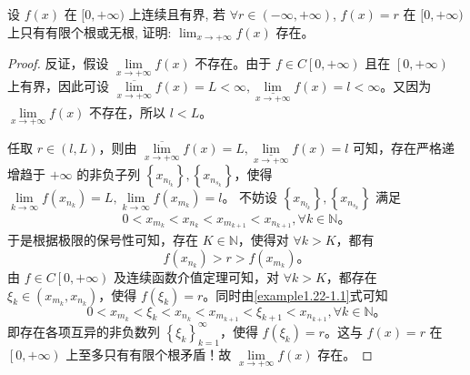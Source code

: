 \documentclass[lang=cn,newtx,10pt,scheme=chinese]{../Template/elegantbook}
\begin{document}
\begin{example}
设 $f(x)$ 在 $[0, +\infty)$ 上连续且有界, 若 $\forall r \in (-\infty, +\infty)$, $f(x) = r$ 在 $[0, +\infty)$ 上只有有限个根或无根, 证明: $\lim_{x \to +\infty} f(x)$ 存在。
\end{example}
\begin{proof}
反证，假设 $\underset{x\rightarrow +\infty}{\lim}f\left( x \right)$ 不存在。由于 $f\in C\left[ 0,+\infty \right)$ 且在 $\left[ 0,+\infty \right)$ 上有界，因此可设 $\underset{x\rightarrow +\infty}{\overline{\lim }}f\left( x \right) =L<\infty ,\underset{x\rightarrow +\infty}{\underline{\lim }}f\left( x \right) =l<\infty$。又因为 $\underset{x\rightarrow +\infty}{\lim}f\left( x \right)$ 不存在，所以 $l<L$。

任取 $r\in \left( l,L \right)$，则由 $\underset{x\rightarrow +\infty}{\overline{\lim }}f\left( x \right) =L,\underset{x\rightarrow +\infty}{\underline{\lim }}f\left( x \right) =l$ 可知，存在严格递增趋于 $+\infty$ 的非负子列 $\left\{ x_{n_{l_k}} \right\},\left\{ x_{n_{s_k}} \right\}$，使得 $\underset{k\rightarrow \infty}{\lim}f\left( x_{n_k} \right) =L,\underset{k\rightarrow \infty}{\lim}f\left( x_{m_k} \right) =l$。
不妨设 $\left\{ x_{n_{l_k}} \right\},\left\{ x_{n_{s_k}} \right\}$ 满足  
\begin{align}
0<x_{m_k}<x_{n_k}<x_{m_{k+1}}<x_{n_{k+1}},\forall k\in \mathbb{N}。 \label{example1.22-1.1}
\end{align}
于是根据极限的保号性可知，存在 $K\in \mathbb{N}$，使得对 $\forall k>K$，都有  
\[
f\left( x_{n_k} \right) >r>f\left( x_{m_k} \right)。
\]
由 $f\in C\left[ 0,+\infty \right)$ 及连续函数介值定理可知，对 $\forall k>K$，都存在 $\xi _k\in \left( x_{m_k},x_{n_k} \right)$，使得 $f\left( \xi _k \right) =r$。同时由\eqref{example1.22-1.1}式可知  
\[
0<x_{m_k}<\xi _k<x_{n_k}<x_{m_{k+1}}<\xi _{k+1}<x_{n_{k+1}},\forall k\in \mathbb{N}。
\]
即存在各项互异的非负数列 $\left\{ \xi _k \right\} _{k=1}^{\infty}$，使得 $f\left( \xi _k \right) =r$。这与 $f\left( x \right) =r$ 在 $\left[ 0,+\infty \right)$ 上至多只有有限个根矛盾！故 $\underset{x\rightarrow +\infty}{\lim}f\left( x \right)$ 存在。

\end{proof}
\end{document}
